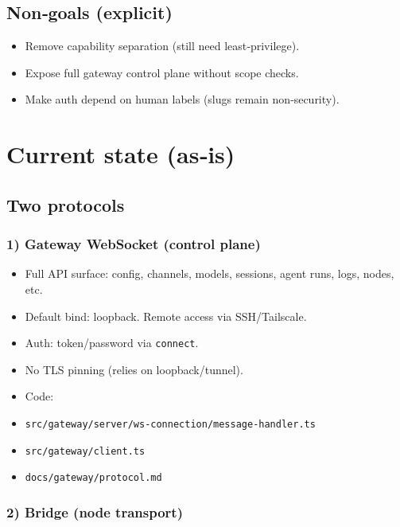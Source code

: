 \subsection{Non‑goals (explicit)}


\begin{itemize}
  \item Remove capability separation (still need least‑privilege).
  \item Expose full gateway control plane without scope checks.
  \item Make auth depend on human labels (slugs remain non‑security).
\end{itemize}


\hrulefill


\section{Current state (as‑is)}


\subsection{Two protocols}


\subsubsection{1) Gateway WebSocket (control plane)}


\begin{itemize}
  \item Full API surface: config, channels, models, sessions, agent runs, logs, nodes, etc.
  \item Default bind: loopback. Remote access via SSH/Tailscale.
  \item Auth: token/password via \texttt{connect}.
  \item No TLS pinning (relies on loopback/tunnel).
  \item Code:
  \item \texttt{src/gateway/server/ws-connection/message-handler.ts}
  \item \texttt{src/gateway/client.ts}
  \item \texttt{docs/gateway/protocol.md}
\end{itemize}


\subsubsection{2) Bridge (node transport)}


